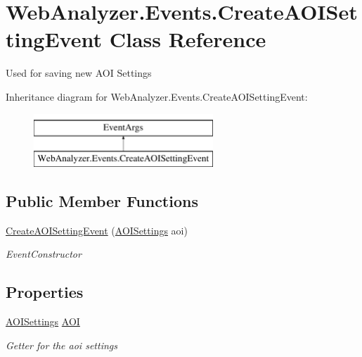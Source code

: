\hypertarget{class_web_analyzer_1_1_events_1_1_create_a_o_i_setting_event}{}\section{Web\+Analyzer.\+Events.\+Create\+A\+O\+I\+Setting\+Event Class Reference}
\label{class_web_analyzer_1_1_events_1_1_create_a_o_i_setting_event}


Used for saving new A\+O\+I Settings  


Inheritance diagram for Web\+Analyzer.\+Events.\+Create\+A\+O\+I\+Setting\+Event\+:\begin{figure}[H]
\begin{center}
\leavevmode
\includegraphics[height=2.000000cm]{class_web_analyzer_1_1_events_1_1_create_a_o_i_setting_event}
\end{center}
\end{figure}
\subsection*{Public Member Functions}
\begin{DoxyCompactItemize}
\item 
\hyperlink{class_web_analyzer_1_1_events_1_1_create_a_o_i_setting_event_aa3c28ac19d3ad160e5b216de3763bfd3}{Create\+A\+O\+I\+Setting\+Event} (\hyperlink{class_web_analyzer_1_1_models_1_1_settings_model_1_1_a_o_i_settings}{A\+O\+I\+Settings} aoi)
\begin{DoxyCompactList}\small\item\em Event\+Constructor \end{DoxyCompactList}\end{DoxyCompactItemize}
\subsection*{Properties}
\begin{DoxyCompactItemize}
\item 
\hyperlink{class_web_analyzer_1_1_models_1_1_settings_model_1_1_a_o_i_settings}{A\+O\+I\+Settings} \hyperlink{class_web_analyzer_1_1_events_1_1_create_a_o_i_setting_event_a9fd4a39178dd304567bc8439d90a4b32}{A\+O\+I}
\begin{DoxyCompactList}\small\item\em Getter for the aoi settings \end{DoxyCompactList}\end{DoxyCompactItemize}
